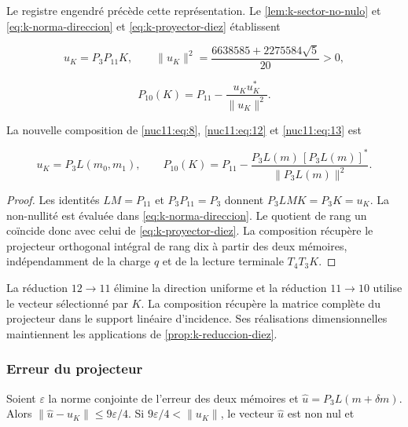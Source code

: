 Le registre engendré précède cette représentation.
Le \cref{lem:k-sector-no-nulo} et
\eqref{eq:k-norma-direccion} et \eqref{eq:k-proyector-diez} établissent



\[
u_K=P_3P_{11}K,\qquad
\|u_K\|^2=\frac{6638585+2275584\sqrt5}{20}>0,
\]





\begin{equation}
P_{10}(K)=P_{11}-\frac{u_Ku_K^*}{\|u_K\|^2}.
\label{nuc11:eq:13}
\end{equation}



La nouvelle composition de \eqref{nuc11:eq:8}, \eqref{nuc11:eq:12} et \eqref{nuc11:eq:13} est



\begin{equation}
\boxed{
u_K=P_3L(m_0,m_1),\qquad
P_{10}(K)=P_{11}-
\frac{P_3L(m)\,[P_3L(m)]^*}{\|P_3L(m)\|^2}.
}
\label{nuc11:eq:14}
\end{equation}



\begin{proof}
Les identités \(LM=P_{11}\) et \(P_3P_{11}=P_3\) donnent
\(P_3LMK=P_3K=u_K\).
La non-nullité est évaluée dans \eqref{eq:k-norma-direccion}.
Le quotient de rang un coïncide donc avec celui de
\eqref{eq:k-proyector-diez}.
La composition récupère le projecteur orthogonal intégral de rang
dix à partir des deux mémoires, indépendamment de la charge
\(q\) et de la lecture terminale \(T_4T_3K\).
\end{proof}

La réduction \(12\to11\) élimine la direction uniforme et la
réduction \(11\to10\) utilise le vecteur sélectionné par \(K\).
La composition récupère la matrice complète du projecteur dans le
support linéaire d’incidence.
Ses réalisations dimensionnelles maintiennent les applications de
\cref{prop:k-reduccion-diez}.


\subsubsection{Erreur du projecteur}

Soient \(\varepsilon\) la norme conjointe de l’erreur des deux
mémoires et \(\widehat u=P_3L(m+\delta m)\).
Alors \(\|\widehat u-u_K\|\le9\varepsilon/4\).
Si \(9\varepsilon/4<\|u_K\|\), le vecteur \(\widehat u\) est non
nul et



